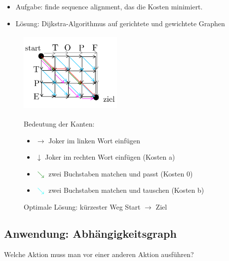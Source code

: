     \begin{itemize}[label={}]
        \item Aufgabe: finde sequence alignment, das die Kosten minimiert.
        \item Lösung: Dijkstra-Algorithmus auf gerichtete und gewichtete Graphen
    \end{itemize}

    \begin{figure}[htbp]
        \begin{minipage}{5cm}
            \vspace*{0mm}
            \includegraphics[width=5cm,height=4cm,keepaspectratio]{./Pictures/Dijkstragitter.png}
        \end{minipage}
        \begin{minipage}{10cm}
            \vspace*{0mm}
            Bedeutung der Kanten:
            \begin{itemize}
                \item $\rightarrow$ Joker im linken Wort einfügen
                \item $\downarrow$ Joker im rechten Wort einfügen (Kosten a)
                \item \textcolor{green}{$\searrow$} zwei Buchstaben matchen und passt (Kosten 0)
                \item \textcolor{cyan}{$\searrow$} zwei Buchstaben matchen und tauschen (Kosten b)
            \end{itemize}
            Optimale Lösung: kürzester Weg Start $\rightarrow$ Ziel
        \end{minipage}
    \end{figure}

    \subsection*{Anwendung: Abhängigkeitsgraph}

    Welche Aktion muss man vor einer anderen Aktion ausführen? \\

